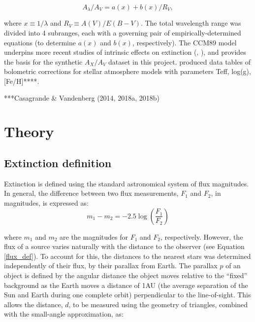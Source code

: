 \documentclass[12pt, a4paper]{report}
\begin{document}

\begin{equation}
A_{\lambda}/A_{V} = a(x) + b(x)/R_{V},
\label{CCM_general}
\end{equation}

where $x \equiv 1/\lambda$ and $R_{V} \equiv A(V)/E(B-V)$. The total wavelength range was divided into 4 subranges, each with a governing pair of empirically-determined equations (to determine $a(x)$ and $b(x)$, respectively). The CCM89 model underpins more recent studies of intrinsic effects on extinction (\cite{2008PASP..120..583G}, \cite{2018MNRAS.479L.102C}), and provides the basis for the synthetic $A_{X}/A_{V}$ dataset in this project.
\cite{2008PASP..120..583G} produced data tables of bolometric corrections for stellar atmosphere models with parameters Teff, log(g), [Fe/H]****.

***Casagrande \& Vandenberg (2014, 2018a, 2018b)



\chapter{Theory}
\section{Extinction definition} \label{extinc_desc}
Extinction is defined using the standard astronomical system of flux magnitudes. In general, the difference between two flux measurements, $F_{1}$ and $F_{2}$, in magnitudes, is expressed as:
\begin{equation}
\label{mags_def}
m_{1} - m_{2} = -2.5\log \left( \frac{F_{1}}{F_{2}} \right)
\end{equation}

where $m_{1}$ and $m_{2}$ are the magnitudes for $F_{1}$ and $F_{2}$, respectively. However, the flux of a source varies naturally with the distance to the observer (see Equation \ref{flux_def}). To account for this, the distances to the nearest stars was determined independently of their flux, by their parallax from Earth. The parallax $p$ of an object is defined by the angular distance the object moves relative to the ``fixed'' background as the Earth moves a distance of 1AU (the average separation of the Sun and Earth during one complete orbit) perpendicular to the line-of-sight. This allows the distance, $d$, to be measured using the geometry of triangles, combined with the small-angle approximation, as:
\end{document}
